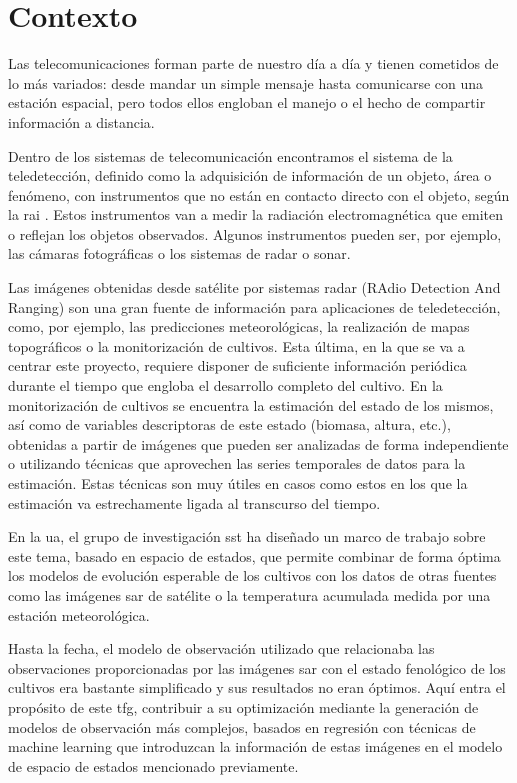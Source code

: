 \section{Contexto}
\par Las telecomunicaciones forman parte de nuestro día a día y tienen cometidos de lo más variados: desde mandar un simple mensaje hasta comunicarse con una estación espacial, pero todos ellos engloban el manejo o el hecho de compartir información a distancia. 
\\
\par Dentro de los sistemas de telecomunicación encontramos el sistema de la teledetección, definido como la adquisición de información de un objeto, área o fenómeno, con instrumentos que no están en contacto directo con el objeto, según la \gls{rai} \cite{RAI}. Estos instrumentos van a medir la radiación electromagnética que emiten o reflejan los objetos observados. Algunos instrumentos pueden ser, por ejemplo, las cámaras fotográficas o los sistemas de radar o sonar.
\\
\par Las imágenes obtenidas desde satélite por sistemas radar (RAdio Detection And Ranging) son una gran fuente de información para aplicaciones de teledetección, como, por ejemplo, las predicciones meteorológicas, la realización de mapas topográficos o la monitorización de cultivos. Esta última, en la que se va a centrar este proyecto, requiere disponer de suficiente información periódica durante el tiempo que engloba el desarrollo completo del cultivo. En la monitorización de cultivos se encuentra la estimación del estado de los mismos, así como de variables descriptoras de este estado (biomasa, altura, etc.), obtenidas a partir de imágenes que pueden ser analizadas de forma independiente o utilizando técnicas que aprovechen las series temporales de datos para la estimación. Estas técnicas son muy útiles en casos como estos en los que la estimación va estrechamente ligada al transcurso del tiempo. 
\\
\par En la \gls{ua}, el grupo de investigación \gls{sst} ha diseñado un marco de trabajo sobre este tema, basado en espacio de estados, que permite combinar de forma óptima los modelos de evolución esperable de los cultivos con los datos de otras fuentes como las imágenes \gls{sar} de satélite o la temperatura acumulada medida por una estación meteorológica. 
\\
\par Hasta la fecha, el modelo de observación utilizado que relacionaba las observaciones proporcionadas por las imágenes \gls{sar} con el estado fenológico de los cultivos era bastante simplificado y sus resultados no eran óptimos. Aquí entra el propósito de este \gls{tfg}, contribuir a su optimización mediante la generación de modelos de observación más complejos, basados en regresión con técnicas de machine learning que introduzcan la información de estas imágenes en el modelo de espacio de estados mencionado previamente. 
\\
\\
\\

